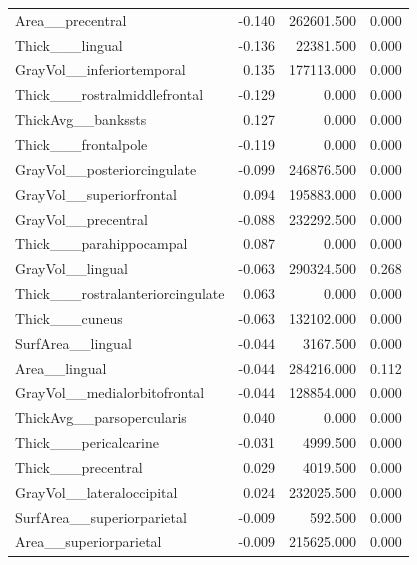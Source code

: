 \documentclass{article}
\begin{document}
\begin{longtable}{lrrr}
	Area\_\_precentral & -0.140 & 262601.500 & 0.000 \\
	Thick\_\_\_lingual & -0.136 & 22381.500 & 0.000 \\
	GrayVol\_\_inferiortemporal & 0.135 & 177113.000 & 0.000 \\
	Thick\_\_\_rostralmiddlefrontal & -0.129 & 0.000 & 0.000 \\
	ThickAvg\_\_bankssts & 0.127 & 0.000 & 0.000 \\
	Thick\_\_\_frontalpole & -0.119 & 0.000 & 0.000 \\
	GrayVol\_\_posteriorcingulate & -0.099 & 246876.500 & 0.000 \\
	GrayVol\_\_superiorfrontal & 0.094 & 195883.000 & 0.000 \\
	GrayVol\_\_precentral & -0.088 & 232292.500 & 0.000 \\
	Thick\_\_\_parahippocampal & 0.087 & 0.000 & 0.000 \\
	GrayVol\_\_lingual & -0.063 & 290324.500 & 0.268 \\
	Thick\_\_\_rostralanteriorcingulate & 0.063 & 0.000 & 0.000 \\
	Thick\_\_\_cuneus & -0.063 & 132102.000 & 0.000 \\
	SurfArea\_\_lingual & -0.044 & 3167.500 & 0.000 \\
	Area\_\_lingual & -0.044 & 284216.000 & 0.112 \\
	GrayVol\_\_medialorbitofrontal & -0.044 & 128854.000 & 0.000 \\
	ThickAvg\_\_parsopercularis & 0.040 & 0.000 & 0.000 \\
	Thick\_\_\_pericalcarine & -0.031 & 4999.500 & 0.000 \\
	Thick\_\_\_precentral & 0.029 & 4019.500 & 0.000 \\
	GrayVol\_\_lateraloccipital & 0.024 & 232025.500 & 0.000 \\
	SurfArea\_\_superiorparietal & -0.009 & 592.500 & 0.000 \\
	Area\_\_superiorparietal & -0.009 & 215625.000 & 0.000 \\
	\end{longtable}
\end{document}
